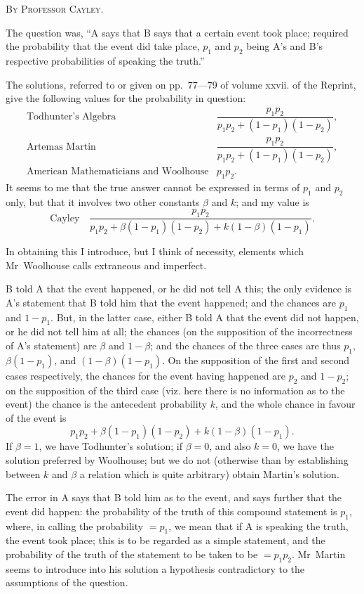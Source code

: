 \documentclass[11pt,a4paper]{book}
\begin{document}
\begin{center}\textsc{By Professor Cayley.}\end{center}

The question was, ``A says that B says that a certain event took place; required the probability that the event did take place, $p_1$ and $p_2$ being A's and B's respective probabilities of speaking the truth.''

The solutions, referred to or given on pp.~77---79 of volume xxvii. of the Reprint, give the following values for the probability in question:
\[
\begin{array}{ll}
\text{Todhunter's Algebra} & \dfrac{p_1p_2}{p_1p_2 + (1-p_1)(1-p_2)}, \\[1.5ex]
\text{Artemas Martin} & \dfrac{p_1p_2}{p_1p_2 + (1-p_1)(1-p_2)}, \\[1.5ex]
\text{American Mathematicians and Woolhouse} & p_1p_2.
\end{array}
\]
It seems to me that the true answer cannot be expressed in terms of $p_1$ and $p_2$ only, but that it involves two other constants $\beta$ and $k$; and my value is
\[
\text{Cayley} \quad \frac{p_1p_2}{p_1p_2 + \beta(1-p_1)(1-p_2) + k(1-\beta)(1-p_1)}.
\]

In obtaining this I introduce, but I think of necessity, elements which Mr~Woolhouse calls extraneous and imperfect.

B told A that the event happened, or he did not tell A this; the only evidence is A's statement that B told him that the event happened; and the chances are $p_1$ and $1-p_1$. But, in the latter case, either B told A that the event did not happen, or he did not tell him at all; the chances (on the supposition of the incorrectness of A's statement) are $\beta$ and $1-\beta$; and the chances of the three cases are thus $p_1$, $\beta(1-p_1)$, and $(1-\beta)(1-p_1)$. On the supposition of the first and second cases respectively, the chances for the event having happened are $p_2$ and $1-p_2$; on the supposition of the third case (viz. here there is no information as to the event) the chance is the antecedent probability $k$, and the whole chance in favour of the event is
\[
p_1p_2 + \beta(1-p_1)(1-p_2) + k(1-\beta)(1-p_1).
\]
If $\beta = 1$, we have Todhunter's solution; if $\beta = 0$, and also $k=0$, we have the solution preferred by Woolhouse; but we do not (otherwise than by establishing between $k$ and $\beta$ a relation which is quite arbitrary) obtain Martin's solution.

The error in A says that B told him as to the event, and says further that the event did happen: the probability of the truth of this compound statement is $p_1$, where, in calling the probability $=p_1$, we mean that if A is speaking the truth, the event took place; this is to be regarded as a simple statement, and the probability of the truth of the statement to be taken to be $=p_1p_2$. Mr~Martin seems to introduce into his solution a hypothesis contradictory to the assumptions of the question.
\end{document}
